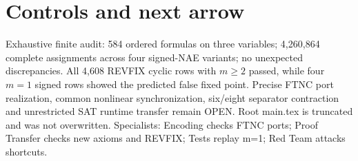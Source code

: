 \documentclass{article}
\begin{document}
\section*{Controls and next arrow}
Exhaustive finite audit: 584 ordered formulas on three variables; 4,260,864 complete assignments across four signed-NAE variants; no unexpected discrepancies. All 4,608 REVFIX cyclic rows with $m\ge2$ passed, while four $m=1$ signed rows showed the predicted false fixed point. Precise FTNC port realization, common nonlinear synchronization, six/eight separator contraction and unrestricted SAT runtime transfer remain OPEN. Root main.tex is truncated and was not overwritten. Specialists: Encoding checks FTNC ports; Proof Transfer checks new axioms and REVFIX; Tests replay m=1; Red Team attacks shortcuts.
\end{document}
